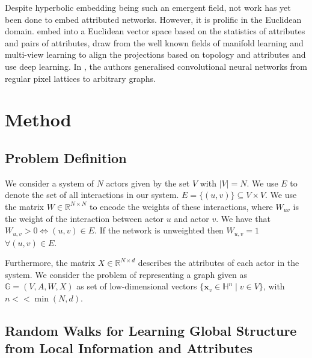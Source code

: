 \documentclass{article}
\begin{document}
Despite hyperbolic embedding being such an emergent field, not work has yet been done to embed attributed networks. 
However, it is prolific in the Euclidean domain. \cite{gibert2012graph} embed into a Euclidean vector space based on the statistics of attributes and pairs of attributes, \cite{li2017attributed} draw from the well known fields of manifold learning and multi-view learning to align the projections based on topology and attributes and \cite{liao2018attributed} use deep learning.
In \cite{niepert2016learning}, the authors generalised convolutional neural networks from regular pixel lattices to arbitrary graphs. 
%	
\section{Method}

\subsection {Problem Definition}

We consider a system of $N$ actors given by the set $V$ with $|V|=N$.
We use $E$ to denote the set of all interactions in our system.
$E = \{(u,v)\} \subseteq V\times V$.
We use the matrix $W\in\mathbb{R}^{N\times N}$ to encode the weights of these interactions, where $W_{uv}$ is the weight of the interaction between actor $u$ and actor $v$.
We have that $W_{u,v} > 0 \iff (u,v)\in E$.
If the network is unweighted then $W_{u,v} = 1$ $\forall (u,v) \in E$.

Furthermore, the matrix $X \in \mathbb{R}^{N \times d}$ describes the attributes of each actor in the system.
We consider the problem of representing a graph given as $\mathbb{G}=(V, A, W, X)$ as set of low-dimensional vectors $\{\textbf{x}_v \in \mathbb{H}^n \mid v \in V \}$, with $n << \min(N, d)$.

\subsection{Random Walks for Learning Global Structure from Local Information and Attributes}
\end{document}
